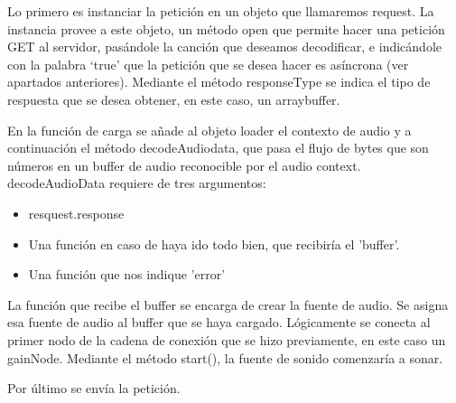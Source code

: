 Lo primero es instanciar la petición en un objeto que llamaremos request.
La instancia provee a este objeto, un método open que permite hacer una petición GET  al servidor,  pasándole la canción que deseamos decodificar, e indicándole con la palabra ‘true’ que la petición que se desea hacer es asíncrona (ver apartados anteriores). 
Mediante el método responseType se indica el tipo de respuesta que se desea obtener, en este caso, un arraybuffer.

En la función de carga se añade al objeto loader el contexto de audio y a continuación el método decodeAudiodata, que pasa el flujo de bytes que son números en un buffer de audio reconocible por el audio context. decodeAudioData requiere de tres argumentos:

\begin{itemize}
 \item resquest.response 
 \item Una función en caso de haya ido todo bien, que recibiría el 'buffer'.
 \item Una función que nos indique 'error'
\end{itemize}

La función que recibe el buffer se encarga de crear la fuente de audio. Se asigna esa fuente de audio al buffer que se haya cargado. Lógicamente se conecta al primer nodo de la cadena de conexión que se hizo previamente, en este caso un gainNode. Mediante el método start(), la fuente de sonido comenzaría a sonar.

Por último se envía la petición.


